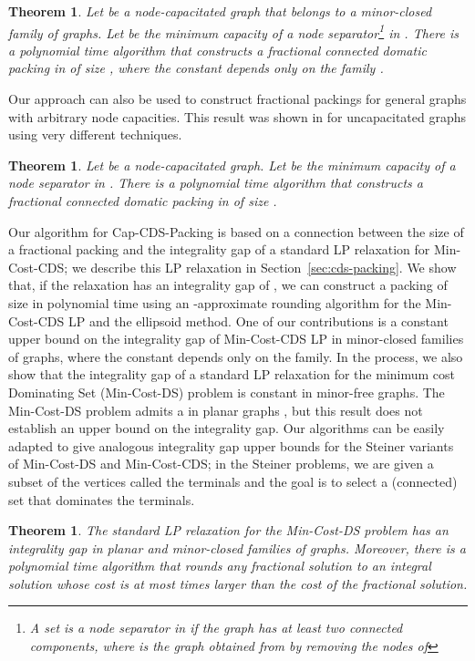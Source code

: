 \documentclass[11pt]{article}
\newtheorem{theorem}[lemma]{Theorem}
\def\prob#1{\textsf{\textup{#1}}\xspace}
\def\capCDSpack{\prob{Cap-CDS-Packing}}
\def\minCDS{\prob{Min-Cost-CDS}}
\def\minDS{\prob{Min-Cost-DS}}
\begin{document}
\begin{theorem} \label{thm:cds-packing-minor-free}
	Let  be a node-capacitated graph that belongs to a
	minor-closed family  of graphs. Let  be the minimum
	capacity of a node separator\footnote{A set  is a node
	separator in  if the graph  has at least two connected
	components, where  is the graph obtained from  by
	removing the nodes of } in . There is a polynomial time
	algorithm that constructs a fractional connected domatic packing
	in  of size , where the constant depends only on
	the family .
\end{theorem}

\noindent
Our approach can also be used to construct fractional packings for
general graphs with arbitrary node capacities. This result was
shown in \cite{CHGK} for uncapacitated graphs using very different
techniques.

\begin{theorem} \label{thm:cds-packing-general}
	Let  be a node-capacitated graph. Let  be the minimum
	capacity of a node separator in . There is a polynomial time
	algorithm that constructs a fractional connected domatic packing
	in  of size .
\end{theorem}

\noindent
Our algorithm for \capCDSpack is based on a connection between the
size of a fractional packing and the integrality gap of a standard LP
relaxation for \minCDS; we describe this LP relaxation in
Section~\ref{sec:cds-packing}. We show that, if the relaxation has an
integrality gap of , we can construct a packing of size  in
polynomial time using an -approximate rounding algorithm for the
\minCDS LP and the ellipsoid method. One of our contributions is a
constant upper bound on the integrality gap of \minCDS LP in
minor-closed families of graphs, where the constant depends only on
the family.  In the process, we also show that the integrality gap of
a standard LP relaxation for the minimum cost \prob{Dominating Set}
(\minDS) problem is constant in minor-free graphs. The \minDS problem
admits a  in planar graphs \cite{Baker94}, but this result
does not establish an upper bound on the integrality gap. Our
algorithms can be easily adapted to give analogous integrality gap
upper bounds for the Steiner variants of \minDS and \minCDS; in the
Steiner problems, we are given a subset of the vertices called the
terminals and the goal is to select a (connected) set that dominates
the terminals.

\begin{theorem} \label{thm:ds-gap-minor-free}
	The standard LP relaxation for the \minDS problem has an 
	integrality gap in planar and minor-closed families of graphs.
	Moreover, there is a polynomial time algorithm that rounds any
	fractional solution to an integral solution whose cost is at most
	 times larger than the cost of the fractional solution.
\end{theorem}
\end{document}

